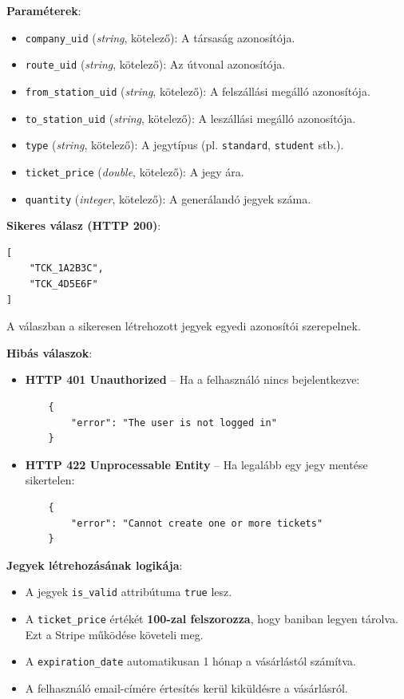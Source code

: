 \textbf{Paraméterek}:
\begin{itemize}
    \item \texttt{company\_uid} (\textit{string}, kötelező): A társaság azonosítója.
    \item \texttt{route\_uid} (\textit{string}, kötelező): Az útvonal azonosítója.
    \item \texttt{from\_station\_uid} (\textit{string}, kötelező): A felszállási megálló azonosítója.
    \item \texttt{to\_station\_uid} (\textit{string}, kötelező): A leszállási megálló azonosítója.
    \item \texttt{type} (\textit{string}, kötelező): A jegytípus (pl. \texttt{standard}, \texttt{student} stb.).
    \item \texttt{ticket\_price} (\textit{double}, kötelező): A jegy ára.
    \item \texttt{quantity} (\textit{integer}, kötelező): A generálandó jegyek száma.
\end{itemize}

\textbf{Sikeres válasz (HTTP 200)}:
\begin{verbatim}
[
    "TCK_1A2B3C",
    "TCK_4D5E6F"
]
\end{verbatim}
A válaszban a sikeresen létrehozott jegyek egyedi azonosítói szerepelnek.

\textbf{Hibás válaszok}:

\begin{itemize}
    \item \textbf{HTTP 401 Unauthorized} – Ha a felhasználó nincs bejelentkezve:
    \begin{verbatim}
    {
        "error": "The user is not logged in"
    }
    \end{verbatim}

    \item \textbf{HTTP 422 Unprocessable Entity} – Ha legalább egy jegy mentése sikertelen:
    \begin{verbatim}
    {
        "error": "Cannot create one or more tickets"
    }
    \end{verbatim}
\end{itemize}

\textbf{Jegyek létrehozásának logikája}:
\begin{itemize}
    \item A jegyek \texttt{is\_valid} attribútuma \texttt{true} lesz.
    \item A \texttt{ticket\_price} értékét \textbf{100-zal felszorozza}, hogy baniban legyen tárolva. Ezt a Stripe működése követeli meg.
    \item A \texttt{expiration\_date} automatikusan 1 hónap a vásárlástól számítva.
    \item A felhasználó email-címére értesítés kerül kiküldésre a vásárlásról.
\end{itemize}

